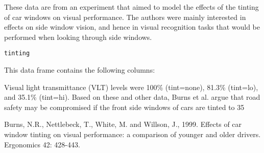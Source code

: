 \begin{Description}\relax
These data are from an experiment that aimed to model the
effects of the tinting of car windows on visual
performance. The authors
were mainly interested in effects on side window vision, and hence in
visual recognition tasks that would be performed when looking through
side windows.
\end{Description}
\begin{Usage}
\begin{verbatim}tinting\end{verbatim}
\end{Usage}
\begin{Format}\relax
This data frame contains the following columns:
\end{Format}
\begin{Details}\relax
Visual light transmittance (VLT) levels were 100\% (tint=none), 
81.3\% (tint=lo), and 35.1\% (tint=hi).  Based on these and other 
data, Burns et al. argue that road safety may be compromised if 
the front side windows of cars are tinted to 35
\end{Details}
\begin{Source}\relax
Burns, N.R., Nettlebeck, T., White, M. and Willson, J., 1999.
Effects of car window tinting on visual performance: a comparison of
younger and older drivers. Ergonomics 42: 428-443.
\end{Source}
